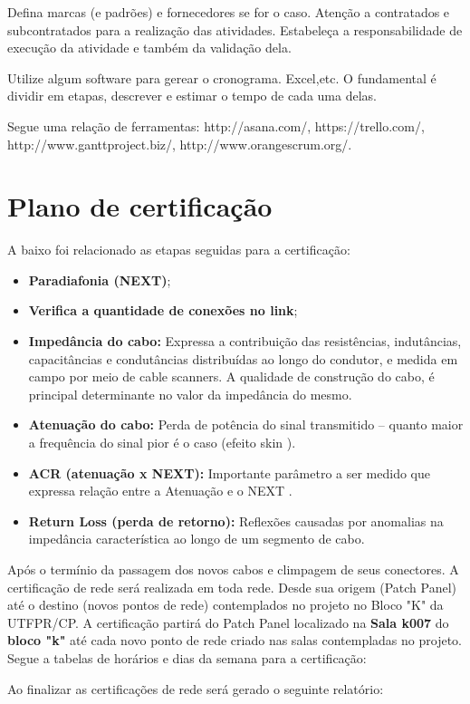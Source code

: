 \documentclass[	DIV=calc,%
							paper=a4,%
							fontsize=12pt,%
							onecolumn]{scrartcl}	 					%
\begin{document}
Defina marcas (e padrões) e fornecedores se for o caso. Atenção a contratados e subcontratados para a realização das atividades. Estabeleça a responsabilidade de execução da atividade e também da validação dela.

Utilize algum software para gerear o cronograma. Excel,etc. O fundamental é dividir em etapas, descrever e estimar o tempo de cada uma delas.

Segue uma relação de ferramentas:
http://asana.com/, 
https://trello.com/, 
http://www.ganttproject.biz/, 
http://www.orangescrum.org/. 

\section{Plano de certificação}
A baixo foi relacionado as etapas seguidas para a certificação:
\begin{itemize}
\item \textbf{Paradiafonia (NEXT)};
\item \textbf{Verifica a quantidade de conexões no link};
\item \textbf{Impedância do cabo:} Expressa a contribuição das resistências, indutâncias, capacitâncias e condutâncias distribuídas ao longo do condutor, e medida em campo por meio de cable scanners. A qualidade de construção do cabo, é principal determinante no valor da impedância do mesmo.
\item \textbf{Atenuação do cabo:} Perda de potência do sinal transmitido – quanto maior a frequência do sinal pior é o caso (efeito skin ).
\item \textbf{ACR (atenuação x NEXT):} Importante parâmetro a ser medido que expressa relação entre a Atenuação e o NEXT .
\item \textbf{Return Loss (perda de retorno):} Reflexões causadas por anomalias na impedância característica ao longo de um segmento de cabo.
\end{itemize}
Após o termínio da passagem dos novos cabos e climpagem de seus conectores. A certificação de rede será realizada em toda rede. Desde sua origem (Patch Panel) até o destino (novos pontos de rede) contemplados no projeto no Bloco "K" da UTFPR/CP. 
A certificação partirá do Patch Panel localizado na \textbf{Sala k007} do \textbf{bloco "k"} até cada novo ponto de rede criado nas salas contempladas no projeto. 
Segue a tabelas de horários e dias da semana para a certificação:



Ao finalizar as certificações de rede será gerado o seguinte relatório:
\end{document}
